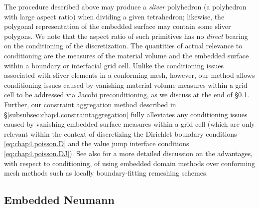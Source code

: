 The procedure described above may produce a \emph{sliver} polyhedron (a polyhedron with large aspect ratio) when dividing a given tetrahedron; likewise, the polygonal representation of the embedded surface may contain some sliver polygons. We note that the aspect ratio of such primitives has no \emph{direct} bearing on the conditioning of the discretization. The quantities of actual relevance to conditioning are the measures of the material volume and the embedded surface within a boundary or interfacial grid cell. Unlike the conditioning issues associated with sliver elements in a conforming mesh, however, our method allows conditioning issues caused by vanishing material volume measures within a grid cell to be addressed via Jacobi preconditioning, as we discuss at the end of \S\ref{subsec:chap4.discretization.neumann}. Further, our constraint aggregation method described in \S\ref{subsubsec:chap4.constraintaggregation} fully alleviates any conditioning issues caused by vanishing embedded surface measures within a grid cell (which are only relevant within the context of discretizing the Dirichlet boundary conditions \eqref{eq:chap4.poisson.D} and the value jump interface conditions \eqref{eq:chap4.poisson.DJ}). See also \cite{Lew.Adrian08} for a more detailed discussion on the advantages, with respect to conditioning, of using embedded domain methods over conforming mesh methods such as locally boundary-fitting remeshing schemes.

\subsection{Embedded Neumann} \label{subsec:chap4.discretization.neumann}


